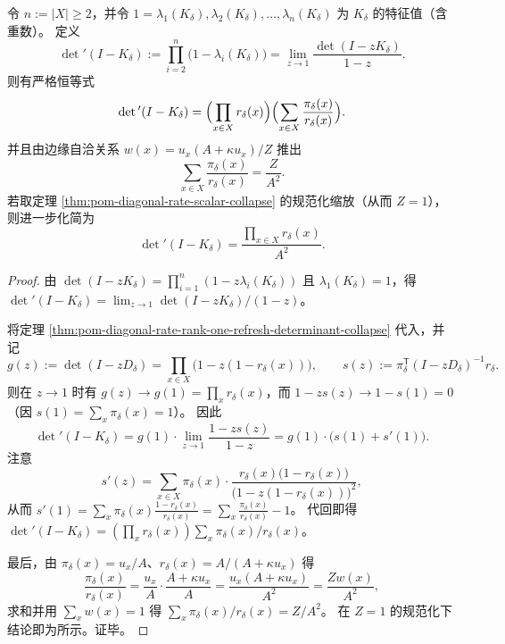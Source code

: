 \begin{corollary}[去平凡特征值的行列式闭式]\label{cor:pom-diagonal-rate-rank-one-refresh-detprime}
令 \(n:=|X|\ge 2\)，并令 \(1=\lambda_1(K_\delta),\lambda_2(K_\delta),\dots,\lambda_n(K_\delta)\) 为 \(K_\delta\) 的特征值（含重数）。
定义
\[
\det{}'(I-K_\delta):=\prod_{i=2}^{n}\bigl(1-\lambda_i(K_\delta)\bigr)
=\lim_{z\to 1}\frac{\det(I-zK_\delta)}{1-z}.
\]
则有严格恒等式
\[
\det{}'(I-K_\delta)
=\Bigl(\prod_{x\in X}r_\delta(x)\Bigr)\Bigl(\sum_{x\in X}\frac{\pi_\delta(x)}{r_\delta(x)}\Bigr).
\]
并且由边缘自洽关系 \(w(x)=u_x(A+\kappa u_x)/Z\) 推出
\[
\sum_{x\in X}\frac{\pi_\delta(x)}{r_\delta(x)}=\frac{Z}{A^2}.
\]
若取定理 \ref{thm:pom-diagonal-rate-scalar-collapse} 的规范化缩放（从而 \(Z=1\)），则进一步化简为
\[
\det{}'(I-K_\delta)=\frac{\prod_{x\in X}r_\delta(x)}{A^2}.
\]
\end{corollary}
\begin{proof}
由 \(\det(I-zK_\delta)=\prod_{i=1}^{n}(1-z\lambda_i(K_\delta))\) 且 \(\lambda_1(K_\delta)=1\)，得
\(
\det{}'(I-K_\delta)=\lim_{z\to 1}\det(I-zK_\delta)/(1-z)
\)。
\par
将定理 \ref{thm:pom-diagonal-rate-rank-one-refresh-determinant-collapse} 代入，并记
\[
g(z):=\det(I-zD_\delta)=\prod_{x\in X}\bigl(1-z(1-r_\delta(x))\bigr),
\qquad
s(z):=\pi_\delta^{\mathsf T}(I-zD_\delta)^{-1}r_\delta.
\]
则在 \(z\to 1\) 时有 \(g(z)\to g(1)=\prod_x r_\delta(x)\)，而
\(
1-zs(z)\to 1-s(1)=0
\)（因 \(s(1)=\sum_x\pi_\delta(x)=1\)）。
因此
\[
\det{}'(I-K_\delta)=g(1)\cdot\lim_{z\to 1}\frac{1-zs(z)}{1-z}
=g(1)\cdot\bigl(s(1)+s'(1)\bigr).
\]
注意
\[
s'(z)=\sum_{x\in X}\pi_\delta(x)\cdot
\frac{r_\delta(x)\bigl(1-r_\delta(x)\bigr)}{\bigl(1-z(1-r_\delta(x))\bigr)^2},
\]
从而
\(
s'(1)=\sum_x\pi_\delta(x)\frac{1-r_\delta(x)}{r_\delta(x)}
=\sum_x\frac{\pi_\delta(x)}{r_\delta(x)}-1
\)。
代回即得
\(
\det{}'(I-K_\delta)
=(\prod_x r_\delta(x))\sum_x \pi_\delta(x)/r_\delta(x)
\)。
\par
最后，由 \(\pi_\delta(x)=u_x/A\)、\(r_\delta(x)=A/(A+\kappa u_x)\) 得
\[
\frac{\pi_\delta(x)}{r_\delta(x)}
=\frac{u_x}{A}\cdot \frac{A+\kappa u_x}{A}
=\frac{u_x(A+\kappa u_x)}{A^2}
=\frac{Zw(x)}{A^2},
\]
求和并用 \(\sum_x w(x)=1\) 得 \(\sum_x\pi_\delta(x)/r_\delta(x)=Z/A^2\)。
在 \(Z=1\) 的规范化下结论即为所示。证毕。
\end{proof}

